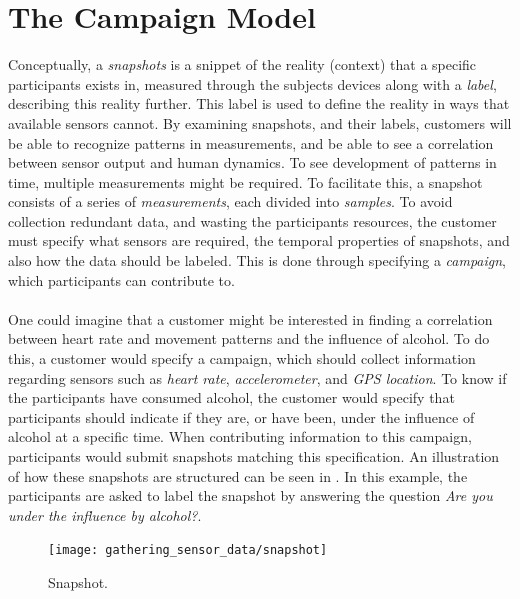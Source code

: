 
\section{The Campaign Model}
Conceptually, a \emph{snapshots} is a snippet of the reality (context) that a specific participants exists in, measured through the subjects devices along with a \emph{label}, describing this reality further. This label is used to define the reality in ways that available sensors cannot. By examining snapshots, and their labels, customers will be able to recognize patterns in measurements, and be able to see a correlation between sensor output and human dynamics. To see development of patterns in time, multiple measurements might be required. To facilitate this, a snapshot consists of a series of \emph{measurements}, each divided into \emph{samples}. To avoid collection redundant data, and wasting the participants resources, the customer must specify what sensors are required, the temporal properties of snapshots, and also how the data should be labeled. This is done through specifying a \emph{campaign}, which participants can contribute to. 
\\\\
One could imagine that a customer might be interested in finding a correlation between heart rate and movement patterns and the influence of alcohol. To do this, a customer would specify a campaign, which should collect information regarding sensors such as \emph{heart rate}, \emph{accelerometer}, and \emph{GPS location}. To know if the participants have consumed alcohol, the customer would specify that participants should indicate if they are, or have been, under the influence of alcohol at a specific time. When contributing information to this campaign, participants would submit snapshots matching this specification. An illustration of how these snapshots are structured can be seen in  . In this example, the participants are asked to label the snapshot by answering the question \emph{Are you under the influence by alcohol?}.

\begin{figure}[!htbp]
    \centering
    \texttt{[image: gathering\_sensor\_data/snapshot]}
    \caption{Snapshot.}
    \label{fig:snapshot_example}
\end{figure}
\FloatBarrier


